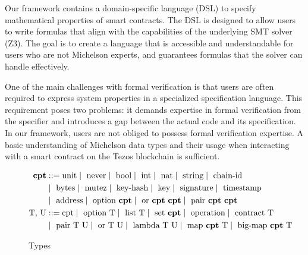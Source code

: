 \documentclass[a4paper,USenglish,cleveref, autoref,anonymous]{lipics-v2021}
\begin{document}
Our framework contains a domain-specific language (DSL) to specify
mathematical properties of smart contracts.
The DSL is designed to allow users to write formulas that align with
the capabilities of the underlying SMT solver (Z3).
The goal is to create a language
that is accessible and understandable for users who are
not Michelson experts, and guarantees formulas that the solver can handle effectively.



One of the main challenges with formal verification is that users are
often required to express  system properties in a specialized
specification language. This requirement poses two problems: it
demands expertise in formal verification from the specifier and
introduces a gap between the actual code and its specification. In our
framework, users are not obliged to possess formal verification
expertise. A basic understanding of Michelson data types and their
usage when interacting with a smart contract on the Tezos blockchain
is sufficient.
\begin{figure}[tp]
\begin{align*}
\textbf{cpt} &::= 
   \text{unit} 
   \mid\ \text{never} 
   \mid\ \text{bool} 
   \mid\ \text{int}
   \mid\ \text{nat}
   \mid\ \text{string}
   \mid\ \text{chain-id} \\
   & \mid\ \text{bytes}
   \mid\ \text{mutez} 
   \mid\ \text{key-hash}
   \mid\ \text{key}
   \mid\ \text{signature}
   \mid\ \text{timestamp} \\
   & \mid\ \text{address} 
   \mid\ \text{option}\ \textbf{cpt}
   \mid\ \text{or}\ \textbf{cpt}\ \textbf{cpt}
   \mid\ \text{pair}\ \textbf{cpt}\ \textbf{cpt} \\
\text{T, U} &::= 
    \text{cpt}
   \mid\ \text{option}\ \text{T}
   \mid\ \text{list}\ \text{T}
   \mid\ \text{set}\ \textbf{cpt} 
   \mid\ \text{operation} 
   \mid\ \text{contract}\ \text{T} \\
  & \mid\ \text{pair}\ \text{T}\ \text{U}
   \mid\ \text{or}\ \text{T}\ \text{U}
   \mid\ \text{lambda}\ \text{T}\ \text{U} 
   \mid\ \text{map}\ \textbf{cpt}\ \text{T}
   \mid\ \text{big-map}\ \textbf{cpt}\ \text{T}
\end{align*}
\caption{Types}
\label{fig:types}
\end{figure}
\end{document}
